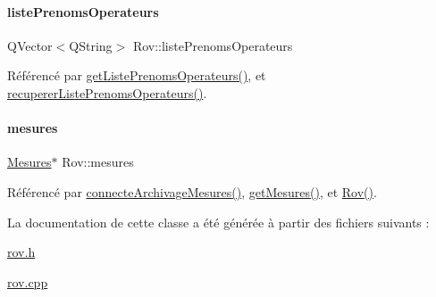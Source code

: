 \mbox{\label{class_rov_a1e059749c13ed4ee9c0ec9168e79a3be}} 
\paragraph{\texorpdfstring{liste\+Prenoms\+Operateurs}{listePrenomsOperateurs}}
{\footnotesize\ttfamily Q\+Vector$<$Q\+String$>$ Rov\+::liste\+Prenoms\+Operateurs\hspace{0.3cm}{\ttfamily [private]}}



Référencé par \hyperlink{class_rov_a128cae6dc19025017dea26663adde765}{get\+Liste\+Prenoms\+Operateurs()}, et \hyperlink{class_rov_a84dece742f5c4c903ada4f25c869597f}{recuperer\+Liste\+Prenoms\+Operateurs()}.

\mbox{\label{class_rov_af37589b38493e4bd99702587db2d28a8}} 
\paragraph{\texorpdfstring{mesures}{mesures}}
{\footnotesize\ttfamily \hyperlink{class_mesures}{Mesures}$\ast$ Rov\+::mesures\hspace{0.3cm}{\ttfamily [private]}}



Référencé par \hyperlink{class_rov_a738965ca84678b506b3d6a326c48e9e3}{connecte\+Archivage\+Mesures()}, \hyperlink{class_rov_a0edd5f7db785bd856b8723fe49ca7848}{get\+Mesures()}, et \hyperlink{class_rov_a5dddd3bd156c134848078296087d090c}{Rov()}.



La documentation de cette classe a été générée à partir des fichiers suivants \+:\begin{DoxyCompactItemize}
\item 
\hyperlink{rov_8h}{rov.\+h}\item 
\hyperlink{rov_8cpp}{rov.\+cpp}\end{DoxyCompactItemize}

